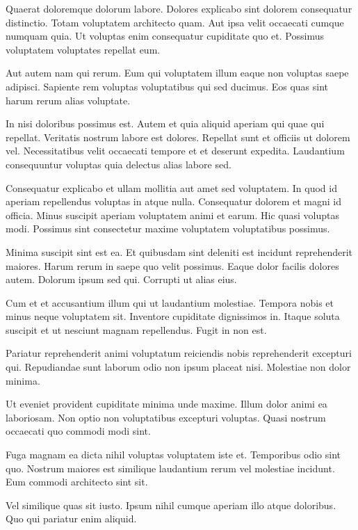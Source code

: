\documentclass[a4paper]{article}
\begin{document}
\begin{multicols}{2}

Quaerat doloremque dolorum labore. Dolores explicabo sint dolorem consequatur
    distinctio. Totam voluptatem architecto quam. Aut ipsa velit occaecati
    cumque numquam quia. Ut voluptas enim consequatur cupiditate quo et.
    Possimus voluptatem voluptates repellat eum.

Aut autem nam qui rerum. Eum qui voluptatem illum eaque non voluptas saepe
    adipisci. Sapiente rem voluptas voluptatibus qui sed ducimus. Eos quas sint
    harum rerum alias voluptate.

In nisi doloribus possimus est. Autem et quia aliquid aperiam qui quae qui
    repellat. Veritatis nostrum labore est dolores. Repellat sunt et officiis ut
    dolorem vel. Necessitatibus velit occaecati tempore et et deserunt expedita.
    Laudantium consequuntur voluptas quia delectus alias labore sed.

Consequatur explicabo et ullam mollitia aut amet sed voluptatem. In quod id
    aperiam repellendus voluptas in atque nulla. Consequatur dolorem et magni id
    officia. Minus suscipit aperiam voluptatem animi et earum. Hic quasi
    voluptas modi. Possimus sint consectetur maxime voluptatem voluptatibus
    possimus.

Minima suscipit sint est ea. Et quibusdam sint deleniti est incidunt
    reprehenderit maiores. Harum rerum in saepe quo velit possimus. Eaque dolor
    facilis dolores autem. Dolorum ipsum sed qui. Corrupti ut alias eius.

Cum et et accusantium illum qui ut laudantium molestiae. Tempora nobis et minus
    neque voluptatem sit. Inventore cupiditate dignissimos in. Itaque soluta
    suscipit et ut nesciunt magnam repellendus. Fugit in non est.

Pariatur reprehenderit animi voluptatum reiciendis nobis reprehenderit excepturi
    qui. Repudiandae sunt laborum odio non ipsum placeat nisi. Molestiae non
    dolor minima.

Ut eveniet provident cupiditate minima unde maxime. Illum dolor animi ea
    laboriosam. Non optio non voluptatibus excepturi voluptas. Quasi nostrum
    occaecati quo commodi modi sint.

Fuga magnam ea dicta nihil voluptas voluptatem iste et. Temporibus odio sint
    quo. Nostrum maiores est similique laudantium rerum vel molestiae incidunt.
    Eum commodi architecto sint sit.

Vel similique quas sit iusto. Ipsum nihil cumque aperiam illo atque doloribus.
    Quo qui pariatur enim aliquid.


\end{multicols}
\end{document}
